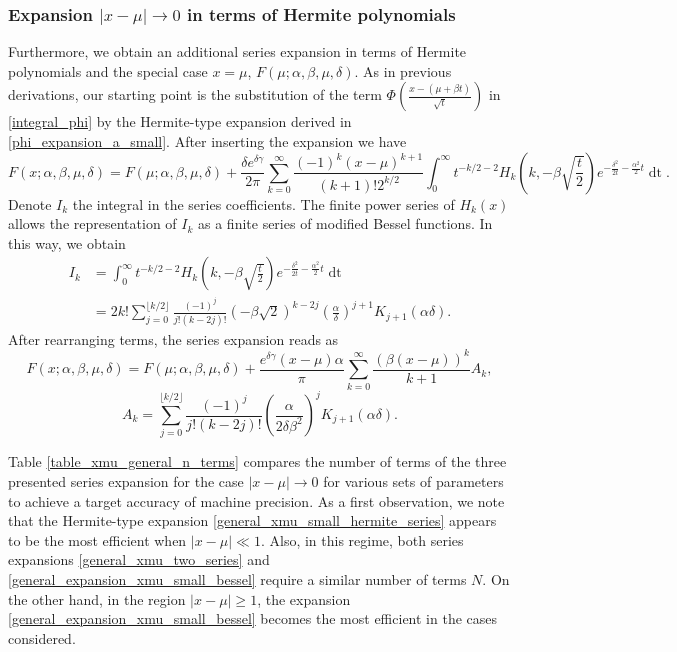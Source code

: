 \documentclass[10pt,a4paper,oneside]{article}
\numberwithin{equation}{section}
\begin{document}
\subsubsection{Expansion $|x-\mu| \to 0$ in terms of Hermite polynomials}
Furthermore, we obtain an additional series expansion in terms of Hermite polynomials and the special case $x=\mu$, $F(\mu; \alpha, \beta, \mu, \delta)$. As in previous derivations, our starting point is the substitution of the term $\Phi\left(\frac{x - (\mu +\beta t)}{\sqrt{t}}\right)$ in \eqref{integral_phi}
by the Hermite-type expansion derived in \eqref{phi_expansion_a_small}. After inserting the expansion we have
\begin{equation}
F(x; \alpha, \beta, \mu, \delta) = F(\mu; \alpha, \beta, \mu, \delta) + \frac{\delta e^{\delta \gamma}}{2\pi} \sum_{k=0}^{\infty}\frac{(-1)^k (x-\mu)^{k+1}}{(k + 1)! 2^{k/2}}\int_0^{\infty} t^{-k/2 - 2} H_k\left(k, -\beta\sqrt{\frac{t}{2}}\right) e^{-\frac{\delta^2}{2t} - \frac{\alpha^2}{2}t} \mathop{dt}.
\end{equation}
Denote $I_k$ the integral in the series coefficients. The finite power series of $H_k(x)$ \cite[\S 18.5.13]{NIST:DLMF} allows the representation of $I_k$ as a finite series of modified Bessel functions. In this way, we obtain
\begin{align}
I_k  &= \int_0^{\infty} t^{-k/2 - 2} H_k\left(k, -\beta\sqrt{\frac{t}{2}}\right) e^{-\frac{\delta^2}{2t} - \frac{\alpha^2}{2}t} \mathop{dt}\\
&= 2k! \sum_{j=0}^{\lfloor k/2 \rfloor} \frac{(-1)^j}{j!(k - 2j)!} (-\beta\sqrt{2})^{k - 2j} \left(\frac{\alpha}{\delta}\right)^{j+1} K_{j+1}(\alpha \delta).
\end{align}
After rearranging terms, the series expansion reads as
\begin{equation}\label{general_xmu_small_hermite_series}
F(x; \alpha, \beta, \mu, \delta) = F(\mu; \alpha, \beta, \mu, \delta) + \frac{e^{\delta \gamma} (x-\mu) \alpha}{\pi} \sum_{k=0}^{\infty} \frac{(\beta(x-\mu))^k}{k+1}A_k,
\end{equation}
\begin{equation}
A_k = \sum_{j=0}^{\lfloor k/2 \rfloor} \frac{(-1)^j}{j!(k - 2j)!} \left(\frac{\alpha}{2\delta \beta^2}\right)^j K_{j+1}(\alpha \delta).
\end{equation}

Table \ref{table_xmu_general_n_terms} compares the number of terms of the three presented series expansion for the case $|x-\mu| \to 0$ for various sets of parameters to achieve a target accuracy of machine precision. As a first observation, we note that the Hermite-type expansion \eqref{general_xmu_small_hermite_series} appears to be the most efficient when $|x-\mu| \ll 1$. Also, in this regime, both series expansions \eqref{general_xmu_two_series} and \eqref{general_expansion_xmu_small_bessel} require a similar number of terms $N$. On the other hand, in the region $|x-\mu| \ge 1$, the expansion \eqref{general_expansion_xmu_small_bessel} becomes the most efficient in the cases considered.
\end{document}
